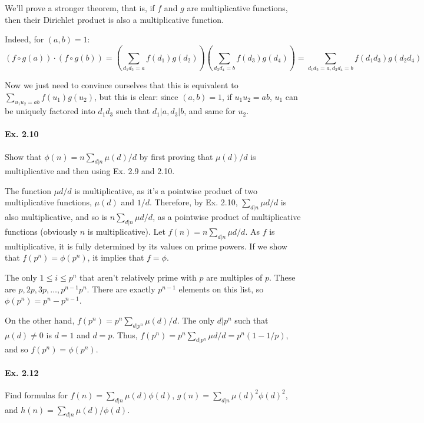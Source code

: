 \documentclass[notitlepage]{article}
\theoremstyle{definition}
\begin{document}
We'll prove a stronger theorem, that is, if $f$ and $g$ are
multiplicative functions, then their Dirichlet product is also a
multiplicative function.

Indeed, for $(a, b) = 1$:
\begin{equation}
  (f \circ g(a)) \cdot (f \circ g(b)) = \left(\sum_{d_1 d_2 = a}
  f(d_1)g(d_2)\right)\left(\sum_{d_3 d_4 = b} f(d_3)g(d_4)\right) =
  \sum_{d_1 d_2 = a, d_3 d_4 = b} f(d_1 d_3) g(d_2 d_4)
\end{equation}

Now we just need to convince ourselves that this is equivalent to
$\sum_{u_1 u_2 = ab} f(u_1)g(u_2)$, but this is clear: since $(a, b) =
1$, if $u_1 u_2 = ab$, $u_1$ can be uniquely factored into $d_1 d_3$
such that $d_1 | a, d_3 | b$, and same for $u_2$.

\paragraph{Ex. 2.10}
Show that $\phi(n) = n \sum_{d|n}\mu(d)/d$ by first proving that
$\mu(d)/d$ is multiplicative and then using Ex. 2.9 and 2.10.

The function $\mu{d}/d$ is multiplicative, as it's a pointwise product
of two multiplicative functions, $\mu(d)$ and $1/d$. Therefore, by
Ex. 2.10, $\sum_{d|n}\mu{d}/d$ is also multiplicative, and so is
$n\sum_{d|n}\mu{d}/d$, as a pointwise product of multiplicative
functions (obviously $n$ is multiplicative).  Let $f(n) = n
\sum_{d|n}\mu{d}/d$. As $f$ is multiplicative, it is fully determined
by its values on prime powers. If we show that $f(p^n) = \phi(p^n)$,
it implies that $f = \phi$.

The only $1 \leq i \leq p^n$ that aren't relatively prime with $p$ are
multiples of $p$. These are $p, 2p, 3p, \ldots, p^{n-1} p^n$. There
are exactly $p^{n-1}$ elements on this list, so $\phi(p^n) = p^n -
p^{n-1}$.

On the other hand, $f(p^n) = p^n \sum_{d|p^n}\mu(d)/d$. The only
$d|p^n$ such that $\mu(d) \ne 0$ is $d = 1$ and $d = p$. Thus, $f(p^n)
= p^n \sum_{d|p^n}\mu{d}/d = p^n(1 - 1/p)$, and so $f(p^n) =
\phi(p^n)$.

\paragraph{Ex. 2.12}
Find formulas for $f(n) = \sum_{d|n} \mu(d)\phi(d)$, $g(n) = \sum_{d|n}
\mu(d)^2\phi(d)^2$, and $h(n) = \sum_{d|n} \mu(d)/\phi(d)$.
\end{document}
